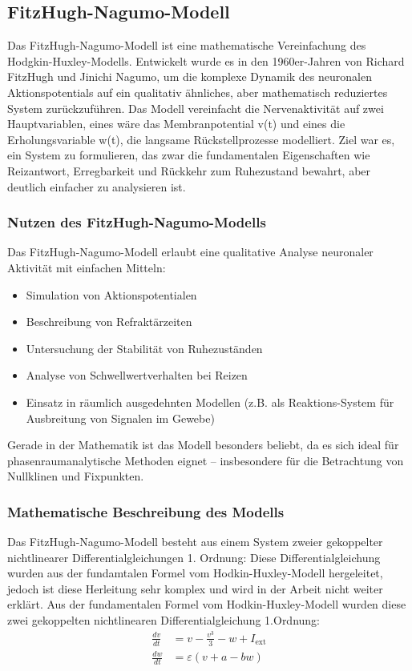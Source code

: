 \begin{refsection}
\section{FitzHugh-Nagumo-Modell}
Das FitzHugh-Nagumo-Modell ist eine mathematische Vereinfachung des Hodgkin-Huxley-Modells. Entwickelt wurde es in den 1960er-Jahren von Richard FitzHugh und Jinichi Nagumo, um die komplexe Dynamik des neuronalen Aktionspotentials auf ein qualitativ ähnliches, aber mathematisch reduziertes System zurückzuführen.
Das Modell vereinfacht die Nervenaktivität auf zwei Hauptvariablen, eines wäre das Membranpotential v(t) und eines die Erholungsvariable w(t), die langsame Rückstellprozesse modelliert.
Ziel war es, ein System zu formulieren, das zwar die fundamentalen Eigenschaften wie Reizantwort, Erregbarkeit und Rückkehr zum Ruhezustand bewahrt, aber deutlich einfacher zu analysieren ist. 
\subsubsection{Nutzen des FitzHugh-Nagumo-Modells}
Das FitzHugh-Nagumo-Modell erlaubt eine qualitative Analyse neuronaler Aktivität mit einfachen Mitteln:
\begin{itemize}
	\item Simulation von Aktionspotentialen
	\item Beschreibung von Refraktärzeiten
	\item Untersuchung der Stabilität von Ruhezuständen
	\item Analyse von Schwellwertverhalten bei Reizen
	\item Einsatz in räumlich ausgedehnten Modellen (z.B. als Reaktions-System für Ausbreitung von Signalen im Gewebe)
\end{itemize}
Gerade in der Mathematik ist das Modell besonders beliebt, da es sich ideal für phasenraumanalytische Methoden eignet – insbesondere für die Betrachtung von Nullklinen und Fixpunkten.
\subsubsection{Mathematische Beschreibung des Modells}
Das FitzHugh-Nagumo-Modell besteht aus einem System zweier gekoppelter nichtlinearer Differentialgleichungen 1. Ordnung:
Diese Differentialgleichung wurden aus der fundamtalen Formel vom Hodkin-Huxley-Modell hergeleitet, jedoch ist diese Herleitung sehr komplex und wird in der Arbeit nicht weiter erklärt. Aus der fundamentalen Formel vom Hodkin-Huxley-Modell wurden diese zwei gekoppelten nichtlinearen Differentialgleichung 1.Ordnung:
\[
\begin{aligned}
	\frac{dv}{dt} &= v - \frac{v^3}{3} - w + I_{\text{ext}} \\
	\frac{dw}{dt} &= \varepsilon (v + a - b w)
\end{aligned}
\]


\end{refsection}
